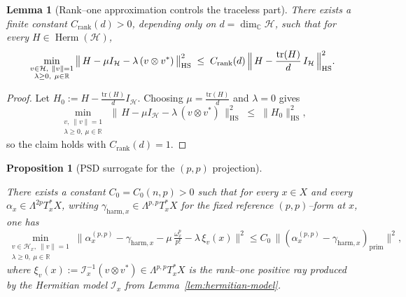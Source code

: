\documentclass[11pt]{article}
\numberwithin{equation}{section}  %
\theoremstyle{plain}
\newtheorem{lemma}[theorem]{Lemma}
\newtheorem{proposition}[theorem]{Proposition}
\theoremstyle{definition}
\theoremstyle{remark}
\newcommand{\C}{\mathbb{C}}
\newcommand{\tr}{\mathrm{tr}}
\newcommand{\HS}{\mathrm{HS}}         %
\DeclareMathOperator{\Herm}{Herm}
\newcommand{\harm}{\mathrm{harm}}
\newcommand{\prim}{\mathrm{prim}}
\begin{document}
\begin{lemma}[Rank--one approximation controls the traceless part]\label{lem:rankone}
	There exists a finite constant $C_{\mathrm{rank}}(d)>0$, depending only on
	$d=\dim_{\C}\mathcal{H}$, such that for every $H \in \Herm(\mathcal{H})$,
	\[
%
\min_{\substack{v\in\mathcal{H},\ \|v\|=1\\ \lambda\ge 0,\ \mu\in\mathbb{R}}}\,
\bigl\|\,H-\mu I_{\mathcal{H}}-\lambda\,(v\otimes v^*)\,\bigr\|_{\HS}^2
\;\le\; C_{\mathrm{rank}}(d)\,
\Bigl\|\,H-\frac{\tr(H)}{d}\,I_{\mathcal{H}}\,\Bigr\|_{\HS}^2.\]
\end{lemma}


\begin{proof}
Let $H_0:=H-\frac{\tr(H)}{d}I_{\mathcal{H}}$.  Choosing $\mu=\frac{\tr(H)}{d}$ and $\lambda=0$ gives
\[
\min_{\substack{v,\ \|v\|=1\\ \lambda\ge 0,\ \mu\in\mathbb{R}}}\,
\bigl\|\,H-\mu I_{\mathcal{H}}-\lambda\,(v\otimes v^*)\,\bigr\|_{\HS}^2
\;\le\;\|H_0\|_{\HS}^2,
\]
so the claim holds with $C_{\mathrm{rank}}(d)=1$.
\end{proof}

\begin{proposition}[PSD surrogate for the $(p,p)$ projection]\label{prop:pp-projection}

There exists a constant $C_{0}=C_{0}(n,p)>0$ such that for every $x\in X$ and every
$\alpha_{x}\in \Lambda^{2p}T_x^*X$, writing $\gamma_{\harm,x}\in \Lambda^{p,p}T_x^*X$
for the fixed reference $(p,p)$--form at $x$, one has
\begin{equation}\label{eq:pp-projection}
%
\min_{\substack{v\in \mathcal H_x,\ \|v\|=1\\ \lambda\ge 0,\ \mu\in\mathbb{R}}}
\bigl\|\alpha_{x}^{(p,p)}-\gamma_{\harm,x}-\mu\,\tfrac{\omega_x^p}{p!}-\lambda\,\xi_{v}(x)\bigr\|^{2}
\le
C_{0}\,\bigl\|(\alpha_{x}^{(p,p)}-\gamma_{\harm,x})_{\prim}\bigr\|^{2},
\tag{23}
\end{equation}
where $\xi_{v}(x):=\mathcal I_x^{-1}(v\otimes v^{*})\in \Lambda^{p,p}T_x^*X$ is the rank--one
\emph{positive} ray produced by the Hermitian model $\mathcal I_x$ from
Lemma~\ref{lem:hermitian-model}.

\end{proposition}
\end{document}
